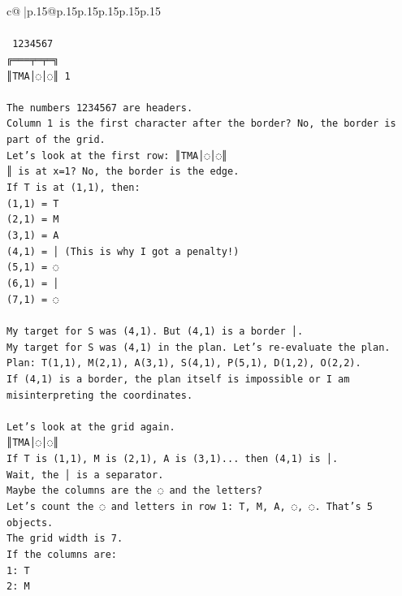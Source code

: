 \documentclass{article}
\begin{document}
{\begin{supertabular}{c@{$\;$}|p{.15\linewidth}@{}p{.15\linewidth}p{.15\linewidth}p{.15\linewidth}p{.15\linewidth}p{.15\linewidth}}
{{{\\ 
\\ 
\texttt{ 1234567} \\
\texttt{╔═══╤═╤═╗} \\
\texttt{║TMA│◌│◌║ 1} \\
\\ 
\texttt{The numbers 1234567 are headers.} \\
\texttt{Column 1 is the first character after the border? No, the border is part of the grid.} \\
\texttt{Let's look at the first row: ║TMA│◌│◌║} \\
\texttt{║ is at x=1? No, the border is the edge.} \\
\texttt{If T is at (1,1), then:} \\
\texttt{(1,1) = T} \\
\texttt{(2,1) = M} \\
\texttt{(3,1) = A} \\
\texttt{(4,1) = │ (This is why I got a penalty!)} \\
\texttt{(5,1) = ◌} \\
\texttt{(6,1) = │} \\
\texttt{(7,1) = ◌} \\
\\ 
\texttt{My target for S was (4,1). But (4,1) is a border │.} \\
\texttt{My target for S was (4,1) in the plan. Let's re{-}evaluate the plan.} \\
\texttt{Plan: T(1,1), M(2,1), A(3,1), S(4,1), P(5,1), D(1,2), O(2,2).} \\
\texttt{If (4,1) is a border, the plan itself is impossible or I am misinterpreting the coordinates.} \\
\\ 
\texttt{Let's look at the grid again.} \\
\texttt{║TMA│◌│◌║} \\
\texttt{If T is (1,1), M is (2,1), A is (3,1)... then (4,1) is │.} \\
\texttt{Wait, the │ is a separator.} \\
\texttt{Maybe the columns are the ◌ and the letters?} \\
\texttt{Let's count the ◌ and letters in row 1: T, M, A, ◌, ◌. That's 5 objects.} \\
\texttt{The grid width is 7.} \\
\texttt{If the columns are:} \\
\texttt{1: T} \\
\texttt{2: M} \\
}}}
\end{supertabular}}
\end{document}
